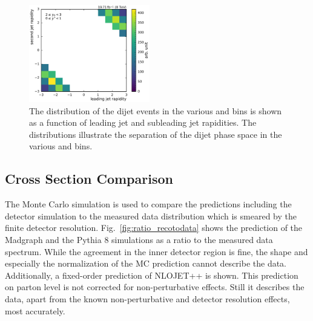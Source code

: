 \begin{figure}[htbp]
    \includegraphics[width=0.47\textwidth]{figures/measurement/jet12_rapidity_yb2ys0.pdf}
    \caption[Rapidities of the two leading jets in the various \ystar and \yboost bins]{
             The distribution of the dijet events in the various \ystar and
             \yboost bins is shown as a function of leading jet and subleading jet
             rapidities. The distributions illustrate the separation of the
             dijet phase space in the various \ystar and \yboost bins.}
    \label{fig:controlplots:rapidity}
\end{figure}


\subsection{Cross Section Comparison}

The Monte Carlo simulation is used to compare the predictions including the
detector simulation to the measured data distribution which is smeared by the
finite detector resolution. Fig.~\ref{fig:ratio_recotodata} shows the prediction
of the Madgraph and the Pythia 8 simulations as a ratio to the measured data
spectrum. While the agreement in the inner detector region is fine, the shape
and especially the normalization of the MC prediction cannot describe the data.
Additionally, a fixed-order prediction of NLOJET++ is shown.  This prediction on
parton level is not corrected for non-perturbative effects. Still it describes
the data, apart from the known non-perturbative and detector resolution effects,
most accurately.

